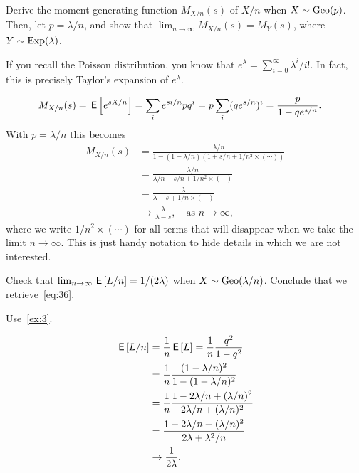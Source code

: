 \documentclass[a4paper,11pt]{article}
\begin{document}
\begin{exercise}
Derive the moment-generating function $M_{X/n}(s)$ of $X/n$ when $X\sim \mathrm{Geo}(p)$.
Then, let $p = \lambda/n$, and show that $\lim_{n\to\infty}M_{X/n}(s) = M_{Y}(s)$, where $Y \sim \mathrm{Exp}(\lambda)$.
\begin{hint}
  If you recall the Poisson distribution, you know that $e^{\lambda} = \sum_{i=0}^{\infty}\lambda^{i}/i!$.
  In fact, this is precisely Taylor's expansion of $e^{\lambda}$.
\end{hint}
\begin{solution}
  \begin{align}
    \label{eq:20}
M_{X/n}(s)
&= \,\mathsf{E}\left[e^{s X/n}\right] = \sum_{i} e^{s i/n} p q^{i} = p\sum_{i} (qe^{s/n})^{i} = \frac{p}{1-qe^{s/n}}.
  \end{align}
With $p=\lambda/n$ this becomes
  \begin{align}
M_{X/n}(s)
&= \frac{\lambda/n}{1-(1-\lambda/n) (1+s/n + 1/n^{2}\times(\cdots))} \\
&= \frac{\lambda/n}{\lambda/n - s/n + 1/n^{2}\times (\cdots)} \\
&= \frac{\lambda}{\lambda - s + 1/n\times(\cdots)} \\
&\to \frac{\lambda}{\lambda - s}, \quad\text{as }  n\to \infty,
  \end{align}
  where we write $1/n^{2}\times(\cdots)$ for all terms that will disappear when we take the limit $n\to \infty$.
  This is just handy notation to hide details in which we are not interested.
\end{solution}
\end{exercise}

\begin{exercise}\label{ex:11}
Check that $\lim_{n\to\infty}\,\mathsf{E}\left[L/n\right] = 1/(2\lambda)$ when $X\sim \mathrm{Geo}(\lambda/n)$. Conclude that  we retrieve~\cref{eq:36}.
\begin{hint}
  Use~\cref{ex:3}.
\end{hint}
\begin{solution}
  \begin{align}
    \label{eq:21}
\,\mathsf{E}\left[L/n\right]  &= \frac 1 n \,\mathsf{E}\left[L\right] = \frac 1 n \frac{q^2}{1-q^{2}} \\
 &= \frac 1 n \frac{(1-\lambda/n)^2}{1-(1-\lambda/n)^{2}} \\
 &= \frac 1 n \frac{1-2 \lambda/n + (\lambda/n)^2}{2 \lambda /n + (\lambda/n)^{2}} \\
 &= \frac{1-2 \lambda/n + (\lambda/n)^2}{2 \lambda + \lambda^{2}/n} \\
&\to \frac 1{2\lambda}.
  \end{align}
\end{solution}
\end{exercise}
\end{document}
